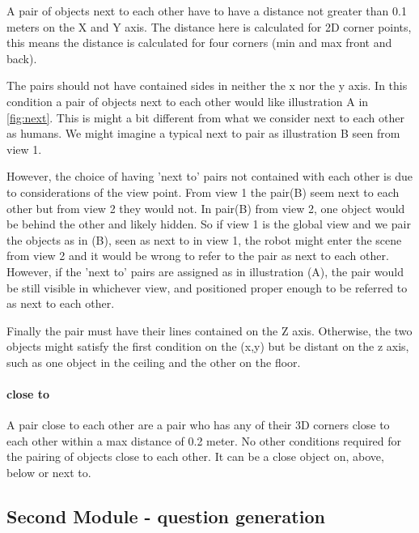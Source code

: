 A pair of objects next to each other have to have a distance not greater than 0.1 meters on the X and Y axis. The distance here is calculated for 2D corner points, this means the distance is calculated for four corners (min and max front and back).

The pairs should not have contained sides in neither the x nor the y axis. In this condition a pair of objects next to each other would like illustration A in \ref{fig:next}. This is might a bit different from what we consider next to each other as humans. We might imagine a typical next to pair as illustration B seen from view 1.

However, the choice of having 'next to' pairs not contained with each other is due to considerations of the view point. From view 1 the pair(B) seem next to each other but from view 2 they would not. In pair(B) from view 2, one object would be behind the other and likely hidden. So if view 1 is the global view and we pair the objects as in (B), seen as next to in view 1, the robot might enter the scene from view 2 and it would be wrong to refer to the pair as next to each other. However, if the 'next to' pairs are assigned as in illustration (A), the pair would be still visible in whichever view, and positioned proper enough to be referred to as next to each other. 

Finally the pair must have their lines contained on the Z axis. Otherwise, the two objects might satisfy the first condition on the (x,y) but be distant on the z axis, such as one object in the ceiling and the other on the floor. 


\paragraph{close to}

A pair close to each other are a pair who has any of their 3D corners close to each other within a max distance of 0.2 meter. No other conditions required for the pairing of objects close to each other. It can be a close object on, above, below or next to. 

\subsection{Second Module - question generation}



